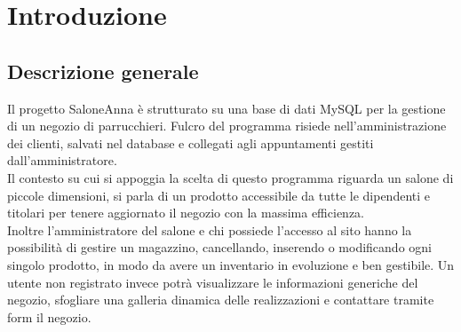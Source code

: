 
\section{Introduzione}
\subsection{Descrizione generale}
	Il progetto SaloneAnna è strutturato su una base di dati MySQL per la gestione di un negozio di parrucchieri. Fulcro del programma risiede nell'amministrazione dei clienti, salvati nel database e collegati agli appuntamenti gestiti dall'amministratore.\\
	Il contesto su cui si appoggia la scelta di questo programma riguarda un salone di piccole dimensioni, si parla di un prodotto accessibile da tutte le dipendenti e titolari per tenere aggiornato il negozio con la massima efficienza.\\
	Inoltre l'amministratore del salone e chi possiede l'accesso al sito hanno la possibilità di gestire un magazzino, cancellando, inserendo o modificando ogni singolo prodotto, in modo da avere un inventario in evoluzione e ben gestibile. Un utente non registrato invece potrà visualizzare le informazioni generiche del negozio, sfogliare una galleria dinamica delle realizzazioni e contattare tramite form il negozio.\\
